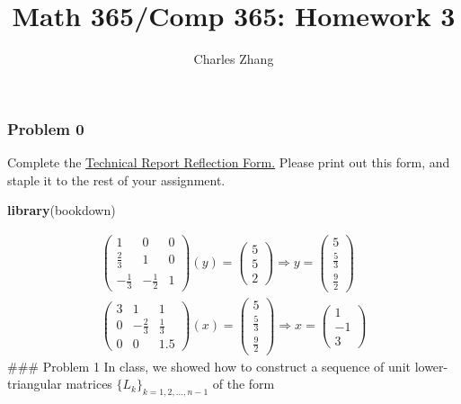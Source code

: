 \documentclass[]{article}
\title{Math 365/Comp 365: Homework 3}
\author{Charles Zhang}
\date{}
\newenvironment{Shaded}{\begin{snugshade}}{\end{snugshade}}
\newcommand{\KeywordTok}[1]{\textcolor[rgb]{0.13,0.29,0.53}{\textbf{#1}}}
\newcommand{\NormalTok}[1]{#1}
\begin{document}
\maketitle

\hypertarget{problem-0}{%
\subsubsection{Problem 0}\label{problem-0}}

Complete the
\href{https://drive.google.com/file/d/1xn2JykJPtHj_Xy1cg3NvNZ2FpB5MZtk3/view?usp=sharing}{Technical
Report Reflection Form.} Please print out this form, and staple it to
the rest of your assignment.

\begin{Shaded}
\begin{Highlighting}[]
\KeywordTok{library}\NormalTok{(bookdown)}
\end{Highlighting}
\end{Shaded}

\[
\begin{array}{l}{\left(\begin{array}{ccc}{1} & {0} & {0} \\ {\frac{2}{3}} & {1} & {0} \\ {-\frac{1}{3}} & {-\frac{1}{2}} & {1}\end{array}\right)(y)=\left(\begin{array}{l}{5} \\ {5} \\ {2}\end{array}\right) \Rightarrow y=\left(\begin{array}{c}{5} \\ {\frac{5}{3}} \\ {\frac{9}{2}}\end{array}\right)} \\ {\left(\begin{array}{ccc}{3} & {1} & {1} \\ {0} & {-\frac{2}{3}} & {\frac{1}{3}} \\ {0} & {0} & {1.5}\end{array}\right)(x)=\left(\begin{array}{c}{5} \\ {\frac{5}{3}} \\ {\frac{9}{2}}\end{array}\right) \Rightarrow x=\left(\begin{array}{c}{1} \\ {-1} \\ {3}\end{array}\right)}\end{array}
\] \#\#\# Problem 1 In class, we showed how to construct a sequence of
unit lower-triangular matrices \(\{L_{k}\}_{k=1,2,\ldots,n-1}\) of the
form
\end{document}
